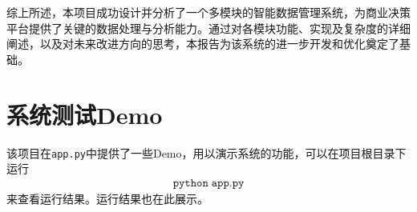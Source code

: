 \documentclass[cn,hazy,blue,10pt,normal]{elegantnote}
\begin{document}
综上所述，本项目成功设计并分析了一个多模块的智能数据管理系统，为商业决策平台提供了关键的数据处理与分析能力。通过对各模块功能、实现及复杂度的详细阐述，以及对未来改进方向的思考，本报告为该系统的进一步开发和优化奠定了基础。





\newpage
\appendix

\section{系统测试Demo}
\label{sec: demo}
该项目在\texttt{app.py}中提供了一些Demo，用以演示系统的功能，可以在项目根目录下运行
\begin{align*}
    \mathtt{python \; app.py}
\end{align*}
来查看运行结果。运行结果也在此展示。
\end{document}
